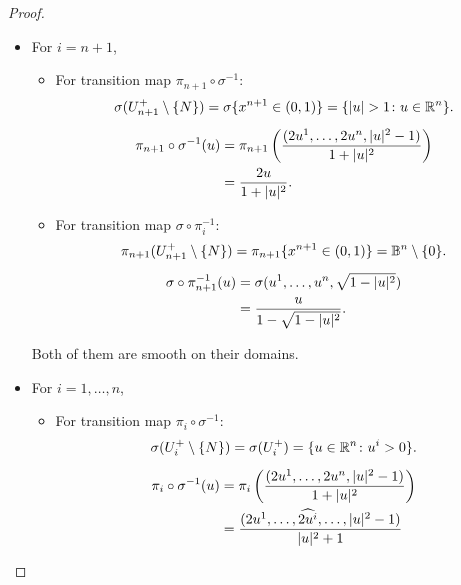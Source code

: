 \begin{problem}
\begin{proof}
\begin{enumerate}
      \begin{itemize}
        \item For $i = n+1$, 
        \begin{itemize}
          \item For transition map $\pi_{n+1} \circ \sigma^{-1} \colon$
          \begin{gather*}
            \sigma(U^+_{n+1} \setminus \{N\}) = \sigma \{x^{n+1} \in (0,1)\} = \{|u|>1 \colon u \in \R^n\}. \\[0.5em]
            \begin{aligned}
                \pi_{n+1} \circ \sigma^{-1}(u) &= \pi_{n+1}\left(\dfrac{(2u^1, \dots, 2u^n, |u|^2-1)}{1+|u|^2}\right) \\
                &= \dfrac{2u}{1+|u|^2}.
            \end{aligned}
        \end{gather*}
          \item For transition map $\sigma \circ \pi_i^{-1} \colon$
          \begin{gather*}
            \pi_{n+1}(U^+_{n+1} \setminus \{N\}) = \pi_{n+1}\{x^{n+1} \in (0,1)\} = \mathbb{B}^n \setminus \{0\}. \\[0.5em]
            \begin{aligned}
                \sigma \circ \pi_{n+1}^{-1}(u) &= \sigma (u^1, \dots, u^n, \sqrt{1-|u|^2}) \\
                &= \dfrac{u}{1-\sqrt{1-|u|^2}}.
            \end{aligned}
        \end{gather*}
        \end{itemize} 
        Both of them are smooth on their domains.
        \item For $i= 1, \dots, n$,
        \begin{itemize}
          \item For transition map $\pi_i \circ \sigma^{-1} \colon$
          \begin{gather*}
            \sigma(U_i^+\setminus \{N\}) = \sigma(U_i^+) = \{u \in \mathbb{R}^n \colon u^i >0\}. \\[0.5em]
            \begin{aligned}
                \pi_i \circ \sigma^{-1}(u) &= \pi_i\left(\dfrac{(2u^1, \dots, 2u^n, |u|^2-1)}{1+|u|^2}\right) \\
                &= \dfrac{(2u^1, \dots, \widehat{2u^i}, \dots, |u|^2-1)}{|u|^2+1}
            \end{aligned}
        \end{gather*}

\end{itemize}
\end{itemize}
\end{enumerate}
\end{proof}
\end{problem}
